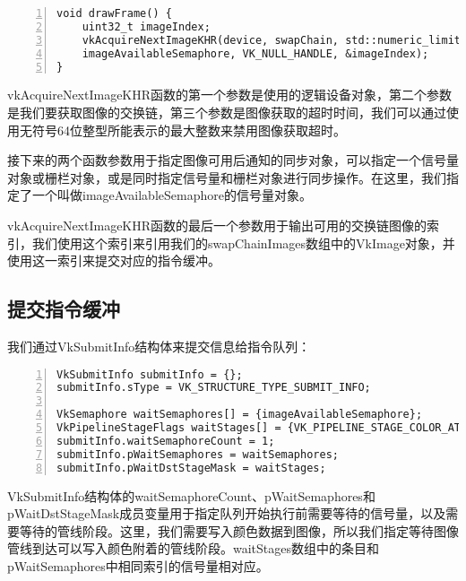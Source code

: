 \documentclass{ctexart}
\begin{document}
\begin{lstlisting}[language={[ANSI]C},keywordstyle=\color{blue!70},commentstyle=\color{red!50!green!50!blue!50},frame=shadowbox, rulesepcolor=\color{red!20!green!20!blue!20},basicstyle=\small,numbers=left, numberstyle=\tiny,breaklines=true]
void drawFrame() {
	uint32_t imageIndex;
	vkAcquireNextImageKHR(device, swapChain, std::numeric_limits<uint64_t>::max(),
	imageAvailableSemaphore, VK_NULL_HANDLE, &imageIndex);
}
\end{lstlisting}

vkAcquireNextImageKHR函数的第一个参数是使用的逻辑设备对象，第二个参数是我们要获取图像的交换链，第三个参数是图像获取的超时时间，我们可以通过使用无符号64位整型所能表示的最大整数来禁用图像获取超时。

接下来的两个函数参数用于指定图像可用后通知的同步对象，可以指定一个信号量对象或栅栏对象，或是同时指定信号量和栅栏对象进行同步操作。在这里，我们指定了一个叫做imageAvailableSemaphore的信号量对象。

vkAcquireNextImageKHR函数的最后一个参数用于输出可用的交换链图像的索引，我们使用这个索引来引用我们的swapChainImages数组中的VkImage对象，并使用这一索引来提交对应的指令缓冲。

\subsection{提交指令缓冲}

我们通过VkSubmitInfo结构体来提交信息给指令队列：

\begin{lstlisting}[language={[ANSI]C},keywordstyle=\color{blue!70},commentstyle=\color{red!50!green!50!blue!50},frame=shadowbox, rulesepcolor=\color{red!20!green!20!blue!20},basicstyle=\small,numbers=left, numberstyle=\tiny,breaklines=true]
VkSubmitInfo submitInfo = {};
submitInfo.sType = VK_STRUCTURE_TYPE_SUBMIT_INFO;

VkSemaphore waitSemaphores[] = {imageAvailableSemaphore};
VkPipelineStageFlags waitStages[] = {VK_PIPELINE_STAGE_COLOR_ATTACHMENT_OUTPUT_BIT};
submitInfo.waitSemaphoreCount = 1;
submitInfo.pWaitSemaphores = waitSemaphores;
submitInfo.pWaitDstStageMask = waitStages;
\end{lstlisting}

VkSubmitInfo结构体的waitSemaphoreCount、pWaitSemaphores和pWaitDstStageMask成员变量用于指定队列开始执行前需要等待的信号量，以及需要等待的管线阶段。这里，我们需要写入颜色数据到图像，所以我们指定等待图像管线到达可以写入颜色附着的管线阶段。waitStages数组中的条目和pWaitSemaphores中相同索引的信号量相对应。
\end{document}
